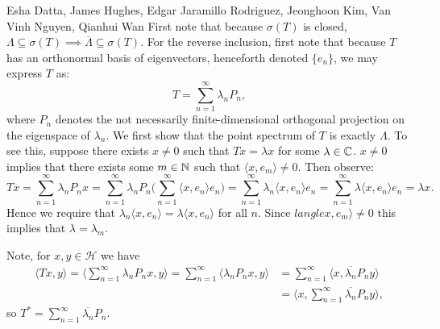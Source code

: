 

\begin{solution}{Esha Datta, James Hughes, Edgar Jaramillo Rodriguez, Jeonghoon Kim, Van Vinh Nguyen, Qianhui Wan}
        First note that because $\sigma(T)$ is closed, $\Lambda \subseteq \sigma(T) \implies \overline{\Lambda} \subseteq \sigma(T)$.
        For the reverse inclusion, first note that because $T$ has an orthonormal basis of eigenvectors, henceforth denoted $\{e_n\}$, we may express $T$ as:
        \[ T = \sum_{n=1}^\infty \lambda_n P_n, \]
        where $P_n$ denotes the not necessarily finite-dimensional orthogonal projection on the eigenspace of $\lambda_n$.
        We first show that the point spectrum of $T$ is exactly $\Lambda$.
        To see this, suppose there exists $x \neq 0$ such that $Tx = \lambda x$ for some $\lambda \in \mathbb{C}$.
        $x\neq 0$ implies that there exists some $m\in\mathbb{N}$ such that $\langle x, e_m \rangle \neq 0$.
        Then observe:
        \begin{equation*}
            Tx = \sum_{n=1}^\infty \lambda_n P_n x = \sum_{n=1}^\infty \lambda_n P_n \bigg( \sum_{n=1}^\infty \langle x, e_n \rangle e_n\bigg) = \sum_{n=1}^\infty \lambda_n \langle x, e_n \rangle e_n = \sum_{n=1}^\infty \lambda \langle x, e_n \rangle e_n = \lambda x.
        \end{equation*}
        Hence we require that $\lambda_n \langle x, e_n \rangle = \lambda \langle x, e_n \rangle$ for all $n$.
        Since $langle x, e_m \rangle \neq 0$ this implies that $\lambda = \lambda_m$. 

        Note, for $x,y\in \mathcal{H}$ we have
        \begin{equation*}
            \begin{split}
                \langle Tx, y \rangle 
                = \langle  \sum_{n=1}^\infty \lambda_n P_n x, y \rangle
                =  \sum_{n=1}^\infty \langle \lambda_n P_n x, y \rangle 
                &= \sum_{n=1}^\infty \langle x, \overline{\lambda_n}P_n y \rangle \\
                &= \langle x, \sum_{n=1}^\infty \overline{\lambda_n}P_n y \rangle,
            \end{split}
        \end{equation*}
        so $T^* = \sum_{n=1}^\infty \overline{\lambda_n}P_n$. 
\end{solution}

